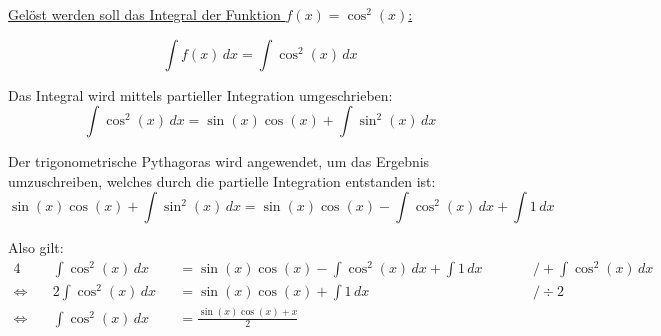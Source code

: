 \documentclass[12pt,a4paper]{article}
\begin{document}
    \setlength{\parindent}{0mm}
    \setcounter{tocdepth}{4}
    \pagestyle{empty}

    \underline{Gelöst werden soll das Integral der Funktion $f(x) = \cos^2(x)$:}

    \vspace{1cm}
    \begin{equation*}
        \int f(x) \, dx = \int \cos^2(x) \, dx
    \end{equation*}

    Das Integral wird mittels partieller Integration umgeschrieben:
    \begin{equation*}
        \int \cos^2(x) \, dx = \sin(x)\cos(x) + \int \sin^2(x) \, dx
    \end{equation*}

    Der trigonometrische Pythagoras wird angewendet, um das Ergebnis umzuschreiben, welches durch die partielle Integration entstanden ist:
    \begin{equation*}
        \sin(x)\cos(x) + \int \sin^2(x) \, dx = \sin(x)\cos(x) - \int \cos^2(x) \, dx + \int 1 \, dx
    \end{equation*}

    Also gilt:
    \begin{alignat}{4}
        & \int \cos^2(x) \, dx &&= \sin(x)\cos(x) - \int \cos^2(x) \, dx + \int 1 \, dx && \qquad\Big / + \int \cos^2(x) \, dx \nonumber \\
        \Leftrightarrow\quad & 2 \int \cos^2(x) \, dx &&= \sin(x)\cos(x) + \int 1 \, dx && \qquad\Big / \div 2 \nonumber \\
        \Leftrightarrow\quad & \int \cos^2(x) \, dx &&= \frac{\sin(x)\cos(x) + x}{2}
    \end{alignat}
\end{document}
